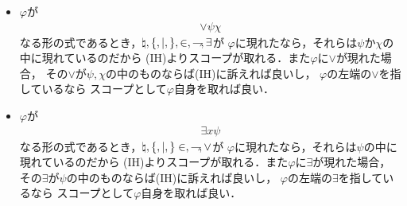 \begin{metaprf}
\begin{description}
\begin{itemize}
					\item $\varphi$が
						\begin{align}
							\vee \psi \chi
						\end{align}
						なる形の式であるとき，$\natural,\{,|,\},\in,\rightharpoondown\hspace{-0.25em},\exists$が
						$\varphi$に現れたなら，それらは$\psi$か$\chi$の中に現れているのだから
						(IH)よりスコープが取れる．また$\varphi$に$\vee$が現れた場合，
						その$\vee$が$\psi,\chi$の中のものならば(IH)に訴えれば良いし，
						$\varphi$の左端の$\vee$を指しているなら
						スコープとして$\varphi$自身を取れば良い．
						
					\item $\varphi$が
						\begin{align}
							\exists x \psi
						\end{align}
						なる形の式であるとき，$\natural,\{,|,\}\in,\rightharpoondown\hspace{-0.25em},\vee$が
						$\varphi$に現れたなら，それらは$\psi$の中に現れているのだから
						(IH)よりスコープが取れる．また$\varphi$に$\exists$が現れた場合，
						その$\exists$が$\psi$の中のものならば(IH)に訴えれば良いし，
						$\varphi$の左端の$\exists$を指しているなら
						スコープとして$\varphi$自身を取れば良い．
						\QED
				\end{itemize}
		\end{description}
	\end{metaprf}